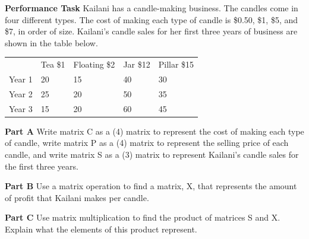 \documentclass{article}
\newenvironment{practice}[2]{}{}        %
\newcommand{\answer}[1]{}               %
\newcommand{\placeholder}[2]{}          %
\newcommand{\te}[1]{}                   %
\begin{document}
\begin{practice}{23}{3}
\textbf{Performance Task} Kailani has a candle-making business. The candles come in four different types. The cost of making each type of candle is \$0.50, \$1, \$5, and \$7, in order of size. Kailani's candle sales for her first three years of business are shown in the table below.
\begin{tabular}{lllll}
 & Tea \$1 & Floating \$2 & Jar \$12 & Pillar \$15 \\
Year 1 & 20 & 15 & 40 & 30 \\
Year 2 & 25 & 20 & 50 & 35 \\
Year 3 & 15 & 20 & 60 & 45 \\
\end{tabular}
\placeholder{illustration}{Four lit candles increasing in size: small tea candle, floating candle in a blue bowl, jar candle, and tall pillar candle, aligned above their table columns.}
\textbf{Part A} Write matrix C as a (4) matrix to represent the cost of making each type of candle, write matrix P as a (4) matrix to represent the selling price of each candle, and write matrix S as a (3) matrix to represent Kailani's candle sales for the first three years.
\answer{(C=\begin{bmatrix}0.50\\1\\5\\7\end{bmatrix}); (P=\begin{bmatrix}1\\2\\12\\15\end{bmatrix}); (S=\begin{bmatrix}20&15&40&30\\25&20&50&35\\15&20&60&45\end{bmatrix}).}
\textbf{Part B} Use a matrix operation to find a matrix, X, that represents the amount of profit that Kailani makes per candle.
\answer{(X=P-C); (X=\begin{bmatrix}0.50\\1\\7\\8\end{bmatrix})}
\textbf{Part C} Use matrix multiplication to find the product of matrices S and X. Explain what the elements of this product represent.
\answer{(SX=\begin{bmatrix}545\\662.5\\807.5\end{bmatrix}). Each element represents Paula's business profits for each of the three years.}
\te{Printed answer names Paula; likely Kailani, as in the prompt.}
\end{practice}
\end{document}

